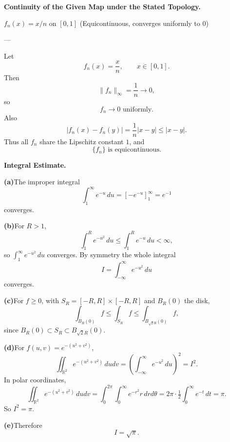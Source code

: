 \begin{problem}[CP-II-0386]
\label{prob:cp-ii-0386}
\textbf{Continuity of the Given Map under the Stated Topology.}

\hspace*{1.5em}$f_n(x)=x/n$ on $[0,1]$ (Equicontinuous, converges uniformly to 0)

---
\end{problem}

\begin{solution}
Let
\[
f_n(x)=\frac xn,
\qquad x\in[0,1].
\]
Then
\[
\|f_n\|_\infty=\frac1n\to0,
\]
so
\[
\boxed{f_n\to0\text{ uniformly}.}
\]
Also
\[
|f_n(x)-f_n(y)|
=
\frac1n|x-y|
\le
|x-y|.
\]
Thus all \(f_n\) share the Lipschitz constant \(1\), and
\[
\boxed{\{f_n\}\text{ is equicontinuous}.}
\]
\end{solution}


\begin{problem}[CP-II-0387]
\label{prob:cp-ii-0387}
\textbf{Integral Estimate.}

\par\smallskip\hspace*{1.5em}\textbf{(a)}\quad The improper integral
	\[
	\int_1^\infty e^{-u}\,du = [-e^{-u}]_1^\infty = e^{-1}
	\]
	converges.

	\par\smallskip\noindent\textbf{(b)}\quad For $R>1$,
	\[
	\int_1^R e^{-u^2}\,du \leq \int_1^R e^{-u}\,du <\infty,
	\]
	so $\int_1^\infty e^{-u^2}\,du$ converges. By symmetry the whole integral
	\[
	I=\int_{-\infty}^\infty e^{-u^2}\,du
	\]
	converges.

	\par\smallskip\noindent\textbf{(c)}\quad For $f\geq 0$, with $S_R=[-R,R]\times[-R,R]$ and $B_R(0)$ the disk,
	\[
	\int_{B_R(0)} f \leq \int_{S_R} f \leq \int_{B_{\sqrt{2}R}(0)} f,
	\]
	since $B_R(0)\subset S_R \subset B_{\sqrt{2}R}(0)$.

	\par\smallskip\noindent\textbf{(d)}\quad For $f(u,v)=e^{-(u^2+v^2)}$,
	\[
	\iint_{\mathbb{R}^2} e^{-(u^2+v^2)}\,dudv = \left(\int_{-\infty}^\infty e^{-u^2}\,du\right)^2=I^2.
	\]
	In polar coordinates,
	\[
	\iint_{\mathbb{R}^2} e^{-(u^2+v^2)}\,dudv
	= \int_0^{2\pi}\int_0^\infty e^{-r^2}r\,drd\theta
	=2\pi\cdot \tfrac{1}{2}\int_0^\infty e^{-t}\,dt = \pi.
	\]
	So $I^2=\pi$.

	\par\smallskip\noindent\textbf{(e)}\quad Therefore
	\[
	I=\sqrt{\pi}.
	\]
\end{problem}

